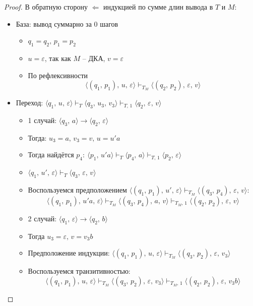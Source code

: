 \documentclass[a4paper,12pt]{article}
\theoremstyle{plain}
\theoremstyle{definition}
\theoremstyle{remark}
\begin{document}
\begin{proof}
	В обратную сторону $\Leftarrow$ индукцией по сумме длин вывода в $T$ и $M$:
	\begin{itemize}
		\item База: вывод суммарно за 0 шагов
		      \begin{itemize}
			      \item $q_1 = q_2,\, p_1 = p_2$
			      \item $u = \varepsilon$, так как $M$ -- ДКА, $v = \varepsilon$
			      \item По рефлексивности
			            \[
				            \langle(q_1,\,p_1),\,u,\,\varepsilon\rangle\vdash_{T_M}\langle(q_2,\,p_2),\,\varepsilon,\,v\rangle
			            \]
		      \end{itemize}
		\item Переход: $\langle q_1,\,u,\,\varepsilon\rangle\vdash_T\langle q_3,\,u_3,\,v_3\rangle\vdash_{T,\,1}\langle q_2,\,\varepsilon,\,v\rangle$
		      \begin{itemize}
			      \item 1 случай: $\langle q_3,\,a\rangle\to\langle q_2,\,\varepsilon\rangle$
			      \item Тогда: $u_3 = a,\, v_3 = v,\, u = u'a$
			      \item Тогда найдётся $p_4 :\: \langle p_1,\,u'a\rangle\vdash_T\langle p_4,\,a\rangle\vdash_{T,\,1}\langle p_2,\,\varepsilon\rangle$
			      \item $\langle q_1,\,u',\,\varepsilon\rangle\vdash_T\langle q_3,\,\varepsilon,\,v\rangle$
			      \item Воспользуемся предположением $\langle(q_1,\,p_1),\,u',\,\varepsilon\rangle\vdash_{T_M}\langle(q_3,\,p_4),\,\varepsilon,\,v\rangle$:
			            \[
				            \langle(q_1,\,p_1),\,u'a,\,\varepsilon\rangle\vdash_{T_M}\langle(q_3,\,p_4),\,a,\,v\rangle\vdash_{T_M,\,1}\langle(q_2,\,p_2),\,\varepsilon,\,v\rangle
			            \]
			      \item 2 случай: $\langle q_1,\,\varepsilon\rangle\to\langle q_2,\,b\rangle$
			      \item Тогда $u_3 = \varepsilon,\, v = v_3b$
			      \item Предположение индукции: $\langle(q_1,\,p_1),\,u,\,\varepsilon\rangle\vdash_{T_M}\langle(q_3,\,p_2),\,\varepsilon,\,v_3\rangle$
			      \item Воспользуемся транзитивностью:
			            \[
				            \langle(q_1,\,p_1),\,u,\,\varepsilon\rangle\vdash_{T_M}\langle(q_3,\,p_2),\,\varepsilon,\,v_3\rangle \vdash_{T_M,\,1}\langle(q_2,\,p_2),\,\varepsilon,\,v_3b\rangle
\]
\end{itemize}
\end{itemize}
\end{proof}
\end{document}
